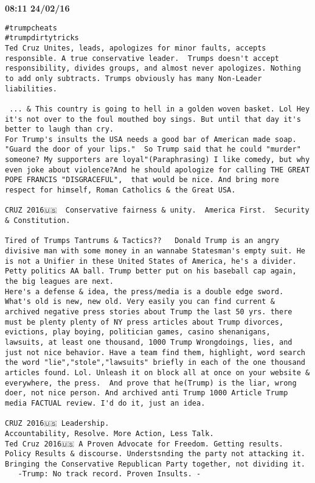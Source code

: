 \begin{adjustwidth}{0cm}{0cm}
\footnotesize \textbf{08:11 24/02/16}

\begin{lstlisting}[breaklines, breakatwhitespace, basicstyle=\small, frame=leftline]
#trumpcheats
#trumpdirtytricks
Ted Cruz Unites, leads, apologizes for minor faults, accepts responsible. A true conservative leader.  Trumps doesn't accept responsibility, divides groups, and almost never apologizes. Nothing to add only subtracts. Trumps obviously has many Non-Leader liabilities.

 ... & This country is going to hell in a golden woven basket. Lol Hey it's not over to the foul mouthed boy sings. But until that day it's better to laugh than cry.
For Trump's insults the USA needs a good bar of American made soap. "Guard the door of your lips."  So Trump said that he could "murder" someone? My supporters are loyal"(Paraphrasing) I like comedy, but why even joke about violence?And he should apologize for calling THE GREAT POPE FRANCIS "DISGRACEFUL",  that would be nice. And bring more respect for himself, Roman Catholics & the Great USA.

CRUZ 2016🇺🇸  Conservative fairness & unity.  America First.  Security & Constitution. 

Tired of Trumps Tantrums & Tactics??   Donald Trump is an angry divisive man with some money in an wannabe Statesman's empty suit. He is not a Unifier in these United States of America, he's a divider.  
Petty politics AA ball. Trump better put on his baseball cap again, the big leagues are next.
Here's a defense & idea, the press/media is a double edge sword. What's old is new, new old. Very easily you can find current & archived negative press stories about Trump the last 50 yrs. there must be plenty plenty of NY press articles about Trump divorces, evictions, play boying, politician games, casino shenanigans, lawsuits, at least one thousand, 1000 Trump Wrongdoings, lies, and just not nice behavior. Have a team find them, highlight, word search the word "lie","stole","lawsuits" briefly in each of the one thousand articles found. Lol. Unleash it on block all at once on your website & everywhere, the press.  And prove that he(Trump) is the liar, wrong doer, not nice person. And archived anti Trump 1000 Article Trump media FACTUAL review. I'd do it, just an idea.

CRUZ 2016🇺🇸 Leadership.
Accountability, Resolve. More Action, Less Talk.
Ted Cruz 2016🇺🇸 A Proven Advocate for Freedom. Getting results. Policy Results & discourse. Understsnding the party not attacking it. Bringing the Conservative Republican Party together, not dividing it. 
   -Trump: No track record. Proven Insults. -


\end{lstlisting}
\end{adjustwidth}
